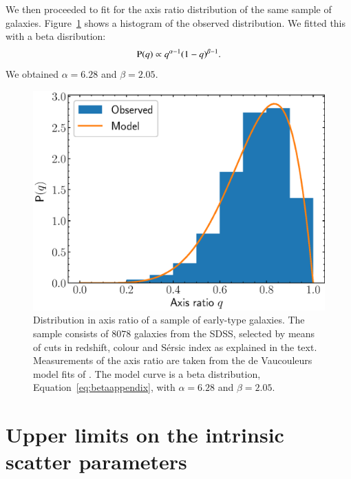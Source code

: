 \documentclass{aa}
\def\Fref#1{Figure~\ref{#1}\xspace}
\def\Eref#1{Equation~\ref{#1}\xspace}
\def\pr{{\rm P}}
\begin{document}
We then proceeded to fit for the axis ratio distribution of the same sample of galaxies.
\Fref{fig:qhist} shows a histogram of the observed distribution.
We fitted this with a beta disribution:
\begin{equation}\label{eq:betaappendix}
\pr(q) \propto q^{\alpha-1}(1 - q)^{\beta-1}.
\end{equation}
We obtained $\alpha=6.28$ and $\beta=2.05$.
\begin{figure}
\includegraphics[width=\columnwidth]{q_dist.eps}
\caption{
Distribution in axis ratio of a sample of early-type galaxies.
The sample consists of $8078$ galaxies from the SDSS, selected by means of cuts in redshift, colour and S\'{e}rsic index as explained in the text.
Measurements of the axis ratio are taken from the de Vaucouleurs model fits of \citet{Mee++15}.
The model curve is a beta distribution, \Eref{eq:betaappendix}, with $\alpha=6.28$ and $\beta=2.05$.
\label{fig:qhist}
}
\end{figure}


\section{Upper limits on the intrinsic scatter parameters}\label{sect:appendixb}
\end{document}
